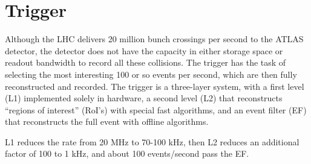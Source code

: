 \section{Trigger}
Although the LHC delivers 20 million bunch crossings per second to the ATLAS detector, the detector does not have the capacity in either storage space or readout bandwidth to record all these collisions.  The trigger has the task of selecting the most interesting 100 or so events per second, which are then fully reconstructed and recorded.  The trigger is a three-layer system, with a first level (L1) implemented solely in hardware, a second level (L2) that reconstructs ``regions of interest'' (RoI's) with special fast algorithms, and an event filter (EF) that reconstructs the full event with offline algorithms.  

L1 reduces the rate from 20 MHz to 70-100 kHz, then L2 reduces an additional factor of 100 to 1 kHz, and about 100 events/second pass the EF.   





